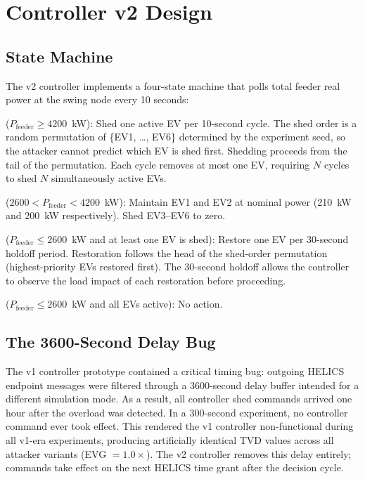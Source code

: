 \section{Controller v2 Design}
\label{app:controller}

\subsection{State Machine}
\label{app:controller-states}

The v2 controller implements a four-state machine that polls total feeder real power at the swing node every 10 seconds:

\begin{description}[leftmargin=1.5em,labelindent=0em]
\item[OVERLOAD] ($P_\text{feeder} \geq 4200$~kW): Shed one active EV per 10-second cycle. The shed order is a random permutation of \{EV1, \ldots, EV6\} determined by the experiment seed, so the attacker cannot predict which EV is shed first. Shedding proceeds from the tail of the permutation. Each cycle removes at most one EV, requiring $N$ cycles to shed $N$ simultaneously active EVs.

\item[CAUTION] ($2600 < P_\text{feeder} < 4200$~kW): Maintain EV1 and EV2 at nominal power (210~kW and 200~kW respectively). Shed EV3--EV6 to zero.

\item[RECOVERY] ($P_\text{feeder} \leq 2600$~kW and at least one EV is shed): Restore one EV per 30-second holdoff period. Restoration follows the head of the shed-order permutation (highest-priority EVs restored first). The 30-second holdoff allows the controller to observe the load impact of each restoration before proceeding.

\item[NORMAL] ($P_\text{feeder} \leq 2600$~kW and all EVs active): No action.
\end{description}

\subsection{The 3600-Second Delay Bug}
\label{app:delay-bug}

The v1 controller prototype contained a critical timing bug: outgoing HELICS endpoint messages were filtered through a 3600-second delay buffer intended for a different simulation mode. As a result, all controller shed commands arrived one hour after the overload was detected. In a 300-second experiment, no controller command ever took effect. This rendered the v1 controller non-functional during all v1-era experiments, producing artificially identical TVD values across all attacker variants (EVG $= 1.0\times$). The v2 controller removes this delay entirely; commands take effect on the next HELICS time grant after the decision cycle.

